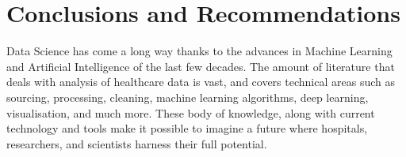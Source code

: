 \documentclass[a4paper,12pt]{article}
\begin{document}


\section{Conclusions and Recommendations}

Data Science has come a long way thanks to the advances in Machine Learning and Artificial Intelligence of the last few decades. The amount of literature that deals with analysis of healthcare data is vast, and covers technical areas such as sourcing, processing, cleaning, machine learning algorithms, deep learning, visualisation, and much more. These body of knowledge, along with current technology and tools make it possible to imagine a future where hospitals, researchers, and scientists harness their full potential.

\pagebreak
\printbibliography
\end{document}
